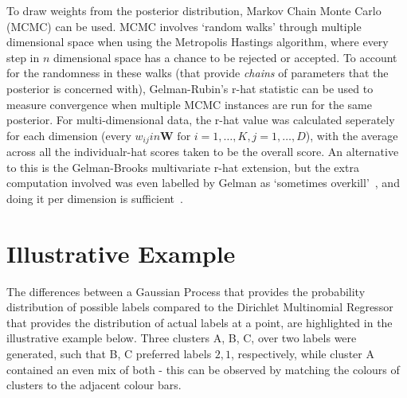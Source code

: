 To draw weights from the posterior distribution, Markov Chain Monte Carlo (MCMC) can be used. MCMC involves `random walks' through multiple dimensional space when using the Metropolis Hastings algorithm, where every step in $n$ dimensional space has a chance to be rejected or accepted. To account for the randomness in these walks (that provide \textit{chains} of parameters that the posterior is concerned with), Gelman-Rubin's r-hat statistic can be used to measure convergence when multiple MCMC instances are run for the same posterior. For multi-dimensional data, the r-hat value was calculated seperately for each dimension (every $w_{ij} in \mathbf{W} \text{ for } i=1,\ldots,K, j=1,\ldots,D$), with the average across all the individualr-hat scores taken to be the overall score. An alternative to this is the Gelman-Brooks multivariate r-hat extension, but the extra computation involved was even labelled by Gelman as `sometimes overkill'~\citep{gelman11}, and doing it per dimension is sufficient~\citep{gelman14}.



\section{Illustrative Example}

The differences between a Gaussian Process that provides the probability distribution of possible labels compared to the Dirichlet Multinomial Regressor that provides the distribution of actual labels at a point, are highlighted in the illustrative example below. Three clusters A, B, C, over two labels were generated, such that B, C preferred labels $2, 1$, respectively, while cluster A contained an even mix of both - this can be observed by matching the colours of clusters to the adjacent colour bars.


